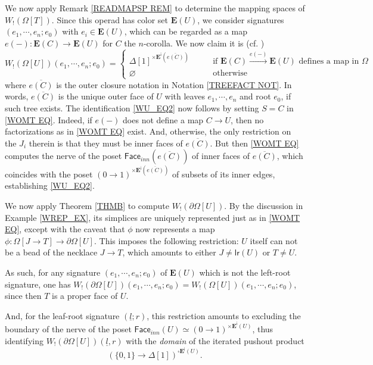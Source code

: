 \documentclass{hha}
\theoremstyle{definition} %
\begin{document}
\begin{example}
We now apply Remark \ref{READMAPSP REM}
to determine the mapping spaces of $W_!(\Omega[T])$.
Since this operad has color set 
$\boldsymbol{E}(U)$,
we consider signatures 
$(e_1,\cdots,e_n;e_0)$ with 
$e_i \in \boldsymbol{E}(U)$,
which can be regarded as a map
$e(-) \colon \boldsymbol{E}(C) \to \boldsymbol{E}(U)$
for $C$ the $n$-corolla.
We now claim it is 
(cf. \cite[\S 4]{CM13b})
\begin{equation}\label{WU_EQ2}
	W_!(\Omega[U])(e_1,\cdots,e_n;e_0) =
	\begin{cases}
	\Delta[1]^{\times \boldsymbol{E}^{\mathsf{i}}(\overline{e(C)})}
	\qquad
&
	\mbox{if $\boldsymbol{E}(C) \xrightarrow{e(-)} \boldsymbol{E}(U)$ defines a map in $\Omega$}
\\
	\varnothing
&
	\mbox{otherwise}
\end{cases}
\end{equation}
where $\overline{e(C)}$ is the outer closure notation in 
Notation \ref{TREEFACT NOT}.
In words, $\overline{e(C)}$ is the unique outer face of $U$
with leaves $e_1,\cdots,e_n$ and root $e_0$,
if such tree exists.
The identification \eqref{WU_EQ2}
now follows by setting $S=C$ in \eqref{WOMT EQ}. 
Indeed, if $e(-)$ does not define a map $C \to U$,
then no factorizations as in \eqref{WOMT EQ} exist.
And, otherwise, the only restriction on the $J_i$ therein
is that they must be inner faces of $\overline{e(C)}$.
But then \eqref{WOMT EQ} computes the nerve of the poset
$\mathsf{Face}_{inn}(\overline{e(C)})$ of inner faces of $\overline{e(C)}$,
which coincides with the poset 
$(0 \to 1)^{\times \boldsymbol{E}^{\mathsf{i}}(\overline{e(C)})}$
of subsets of its inner edges,
establishing \eqref{WU_EQ2}.
\end{example}




\begin{example}\label{WPARTIALT_EX}
	We now apply Theorem \ref{THMB} to compute
	$W_!(\partial \Omega[U])$.
	By the discussion in Example \ref{WREP_EX},
	its simplices are uniquely represented just as in 
	\eqref{WOMT EQ},
	except with the caveat that $\phi$
	now represents a map
	$\phi \colon \Omega[J\to T] \to \partial \Omega[U]$.
	This imposes the following restriction: $U$ itself can not be a bead of the necklace $J\to T$,
	which amounts to either 
	$J\neq \mathsf{lr}(U)$ or $T\neq U$.
	
	As such, for any signature
	$(e_1,\cdots,e_n;e_0)$ of $\boldsymbol{E}(U)$
	which is not the left-root signature,
	one has
	$W_!(\partial \Omega[U])(e_1,\cdots,e_n;e_0) =
	W_!(\Omega[U])(e_1,\cdots,e_n;e_0)$,
	since then $T$ is a proper face of $U$.
	
	And, for the leaf-root signature $(\underline{l};r)$,
	this restriction amounts to excluding the boundary
	of the nerve of the poset 
	$\mathsf{Face}_{inn}(U)
	\simeq 
	(0 \to 1)^{\times \boldsymbol{E}^{\mathsf{i}}(U)}$,
	thus identifying 	$W_!(\partial \Omega[U])(\underline{l},r)$ 
	with the \emph{domain} of the iterated pushout product
	\[
	\left(
	\{0,1\} \to \Delta[1]
	\right)^{\square \boldsymbol{E}^{\mathsf{i}}(U)}.
	\]
\end{example}
\end{document}
